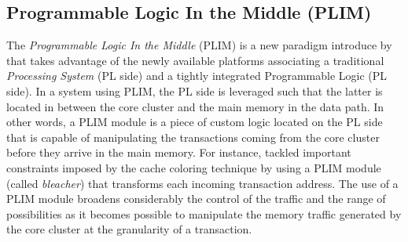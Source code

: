     \subsection{Programmable Logic In the Middle (PLIM)}
        The \emph{Programmable Logic In the Middle} (PLIM) is a new paradigm introduce by \cite{PLIM20} that takes advantage of the newly available platforms associating a traditional \emph{Processing System} (PL side) and a tightly integrated Programmable Logic (PL side).
        In a system using PLIM, the PL side is leveraged such that the latter is located in between the core cluster and the main memory in the data path.
        In other words, a PLIM module is a piece of custom logic located on the PL side that is capable of manipulating the transactions coming from the core cluster before they arrive in the main memory.
        For instance, \cite{PLIM20} tackled important constraints imposed by the cache coloring technique by using a PLIM module (called \emph{bleacher}) that transforms each incoming transaction address.
        The use of a PLIM module broadens considerably the control of the traffic and the range of possibilities as it becomes possible to manipulate the memory traffic generated by the core cluster at the granularity of a transaction.
